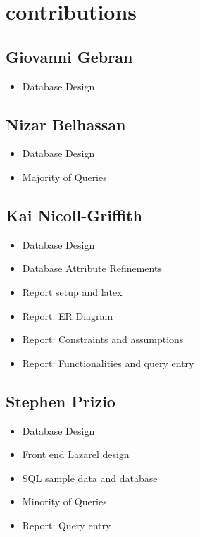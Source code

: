 \documentclass[11pt,letterpaper]{article}
\begin{document}
\section{contributions}
\subsection{Giovanni Gebran}
 \begin{itemize}
\item Database Design
\end{itemize}
\subsection{Nizar Belhassan}
 \begin{itemize}
\item Database Design
\item Majority of Queries
\end{itemize}
\subsection{Kai Nicoll-Griffith}
 \begin{itemize}
\item Database Design
\item Database Attribute Refinements
\item Report setup and latex
\item Report: ER Diagram
\item Report: Constraints and assumptions
\item Report: Functionalities and query entry
\end{itemize}
\subsection{Stephen Prizio}
 \begin{itemize}
	\item Database Design
	\item Front end Lazarel design
	\item SQL sample data and database 
	\item Minority of Queries
	\item Report: Query entry
\end{itemize}
\end{document}
